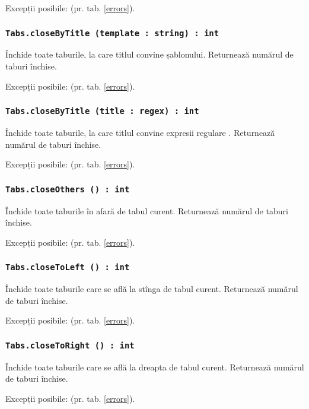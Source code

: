 Excepții posibile:  (pr. tab. \ref{errors}).

\subsubsection{\lstinline|Tabs.closeByTitle (template : string) : int|}

Închide toate taburile, la care titlul convine șablonului. Returnează numărul de taburi închise.

Excepții posibile:  (pr. tab. \ref{errors}).

\subsubsection{\lstinline|Tabs.closeByTitle (title : regex) : int|}

Închide toate taburile, la care titlul convine expresii regulare . Returnează numărul de taburi închise.

Excepții posibile:  (pr. tab. \ref{errors}).

\subsubsection{\lstinline|Tabs.closeOthers () : int|}

Închide toate taburile în afară de tabul curent. Returnează numărul de taburi închise.

Excepții posibile:  (pr. tab. \ref{errors}).

\subsubsection{\lstinline|Tabs.closeToLeft () : int|}

Închide toate taburile care se află la stînga de tabul curent. Returnează numărul de taburi închise.

Excepții posibile:  (pr. tab. \ref{errors}).

\subsubsection{\lstinline|Tabs.closeToRight () : int|}

Închide toate taburile care se află la dreapta de tabul curent. Returnează numărul de taburi închise.

Excepții posibile:  (pr. tab. \ref{errors}).

